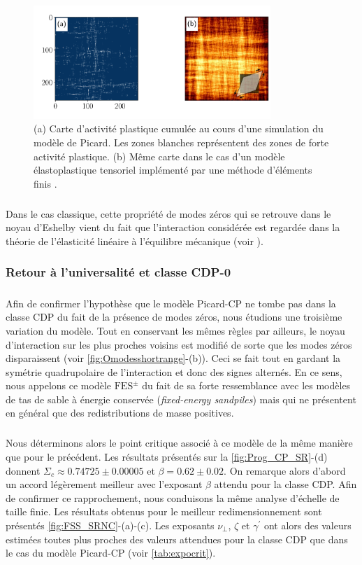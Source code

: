\begin{figure}[h]
	\centering
	\includegraphics[width=0.8\textwidth]{Chapitre4/Figures/CourtePortee/StrainLoc.pdf}
	\caption{(a) Carte d'activité plastique cumulée au cours d'une simulation du modèle de Picard. Les zones blanches représentent des zones de forte activité plastique. (b) Même carte dans le cas d'un modèle élastoplastique tensoriel implémenté par une méthode d'éléments finis \cite{budrikis_universal_2017}.}
	\label{fig:FractalDim}
\end{figure} 

\subparagraph{}Dans le cas classique, cette propriété de modes zéros qui se retrouve dans le noyau d'Eshelby vient du fait que l'interaction considérée est regardée dans la théorie de l’élasticité linéaire à l'équilibre mécanique (voir ). 

\subsubsection{Retour à l'universalité et classe CDP-0}

\label{sec:continuCDP0}

\subparagraph{}Afin de confirmer l'hypothèse que le modèle Picard-CP ne tombe pas dans la classe CDP du fait de la présence de modes zéros, nous étudions une troisième variation du modèle. Tout en conservant les mêmes règles par ailleurs, le noyau d'interaction sur les plus proches voisins est modifié de sorte que les modes zéros disparaissent (voir \autoref{fig:Omodesshortrange}-(b)). Ceci se fait tout en gardant la symétrie quadrupolaire de l'interaction et donc des signes alternés. En ce sens, nous appelons ce modèle $\text{FES}^\pm$ du fait de sa forte ressemblance avec les modèles de tas de sable à énergie conservée (\textit{fixed-energy sandpiles}) mais qui ne présentent en général que des redistributions de masse positives.

\subparagraph{}Nous déterminons alors le point critique associé à ce modèle de la même manière que pour le précédent. Les résultats présentés sur la \autoref{fig:Prog_CP_SR}-(d) donnent $\Sigma_c \approx 0.74725 \pm 0.00005$ et $\beta = 0.62 \pm 0.02$. On remarque alors d'abord un accord légèrement meilleur avec l'exposant $\beta$ attendu pour la classe CDP. Afin de confirmer ce rapprochement, nous conduisons la même analyse d'échelle de taille finie. Les résultats obtenus pour le meilleur redimensionnement sont présentés \autoref{fig:FSS_SRNC}-(a)-(c). Les exposants $\nu_\perp$, $\zeta$ et $\gamma^\prime$ ont alors des valeurs estimées toutes plus proches des valeurs attendues pour la classe CDP que dans le cas du modèle Picard-CP (voir \autoref{tab:expocrit}). 

